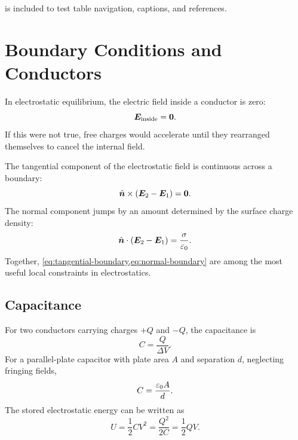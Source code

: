  is included to test table navigation, captions, and references.

\newpage

\section{Boundary Conditions and Conductors}
\label{sec:conductors}

In electrostatic equilibrium, the electric field inside a conductor is zero:
\begin{equation}
  \bm{E}_{\mathrm{inside}} = \bm{0}.
  \label{eq:conductor-inside}
\end{equation}
If this were not true, free charges would accelerate until they rearranged themselves to cancel the internal field.

The tangential component of the electrostatic field is continuous across a boundary:
\begin{equation}
  \hat{\bm{n}}\times(\bm{E}_2-\bm{E}_1)=\bm{0}.
  \label{eq:tangential-boundary}
\end{equation}
The normal component jumps by an amount determined by the surface charge density:
\begin{equation}
  \hat{\bm{n}}\cdot(\bm{E}_2-\bm{E}_1)
  =
  \frac{\sigma}{\varepsilon_0}.
  \label{eq:normal-boundary}
\end{equation}
Together, \cref{eq:tangential-boundary,eq:normal-boundary} are among the most useful local constraints in electrostatics.

\subsection{Capacitance}

For two conductors carrying charges \(+Q\) and \(-Q\), the capacitance is
\begin{equation}
  C = \frac{Q}{\Delta V}.
  \label{eq:capacitance-definition}
\end{equation}
For a parallel-plate capacitor with plate area \(A\) and separation \(d\), neglecting fringing fields,
\begin{equation}
  C = \frac{\varepsilon_0 A}{d}.
  \label{eq:parallel-plate-capacitance}
\end{equation}
The stored electrostatic energy can be written as
\begin{equation}
  U = \frac{1}{2}CV^2
    = \frac{Q^2}{2C}
    = \frac{1}{2}Q V.
  \label{eq:capacitor-energy}
\end{equation}

